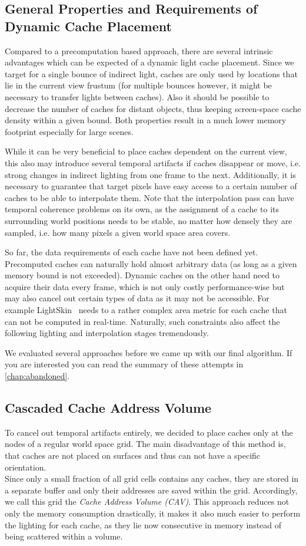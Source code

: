\documentclass[thesis.tex]{subfiles}
\begin{document}
\subsection{General Properties and Requirements of Dynamic Cache Placement}
Compared to a precomputation based approach, there are several intrinsic advantages which can be expected of a dynamic light cache placement.
Since we target for a single bounce of indirect light, caches are only used by locations that lie in the current view frustum (for multiple bounces however, it might be necessary to transfer lights between caches).
Also it should be possible to decrease the number of caches for distant objects, thus keeping screen-space cache density within a given bound.
Both properties result in a much lower memory footprint especially for large scenes.

While it can be very beneficial to place caches dependent on the current view, this also may introduce several temporal artifacts if caches disappear or move, i.e. strong changes in indirect lighting from one frame to the next.
Additionally, it is necessary to guarantee that target pixels have easy access to a certain number of caches to be able to interpolate them.
Note that the interpolation pass can have temporal coherence problems on its own, as the assignment of a cache to its surrounding world positions needs to be stable, no matter how densely they are sampled, i.e. how many pixels a given world space area covers.

So far, the data requirements of each cache have not been defined yet.
Precomputed caches can naturally hold almost arbitrary data (as long as a given memory bound is not exceeded).
Dynamic caches on the other hand need to acquire their data every frame, which is not only costly performance-wise but may also cancel out certain types of data as it may not be accessible. For example LightSkin~\cite{bib:LightskinPaper} needs to a rather complex area metric for each cache that can not be computed in real-time.
Naturally, such constraints also affect the following lighting and interpolation stages tremendously.

We evaluated several approaches before we came up with our final algorithm.
If you are interested you can read the summary of these attempts in \autoref{chap:abandoned}.

\subsection{Cascaded Cache Address Volume}
To cancel out temporal artifacts entirely, we decided to place caches only at the nodes of a regular world space grid.
The main disadvantage of this method is, that caches are not placed on surfaces and thus can not have a specific orientation.\\
Since only a small fraction of all grid cells contains any caches, they are stored in a separate buffer and only their addresses are saved within the grid.
Accordingly, we call this grid the \emph{Cache Address Volume (CAV)}.
This approach reduces not only the memory consumption drastically, it makes it also much easier to perform the lighting for each cache, as they lie now consecutive in memory instead of being scattered within a volume.
\end{document}

